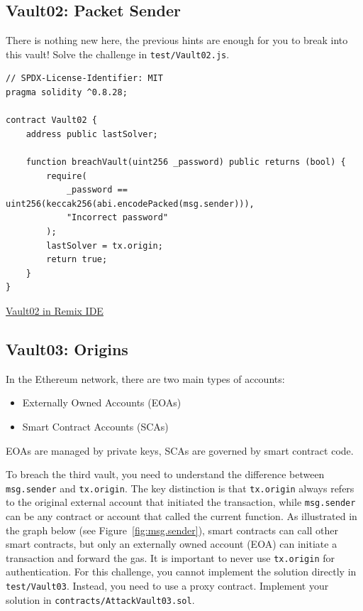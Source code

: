 \documentclass[12pt]{article}
\begin{document}
\subsection*{Vault02: Packet Sender}

There is nothing new here, the previous hints are enough for you to break into this vault! Solve the challenge in \texttt{test/Vault02.js}.

\begin{lstlisting}[language=Solidity]
// SPDX-License-Identifier: MIT
pragma solidity ^0.8.28;
 
contract Vault02 {
    address public lastSolver;
 
    function breachVault(uint256 _password) public returns (bool) {
        require(
            _password == uint256(keccak256(abi.encodePacked(msg.sender))),
            "Incorrect password"
        );
        lastSolver = tx.origin;
        return true;
    }
}
\end{lstlisting}

\medskip
\noindent
\href{https://remix.ethereum.org/?#activate=solidity&url=https://github.com/radovluk/unbreakable-vault/contracts/Vault02.sol&lang=en&optimize=false&runs=200&evmVersion=null&version=soljson-v0.8.28+commit.7893614a.js}{Vault02 in Remix IDE}

\subsection*{Vault03: Origins}

In the Ethereum network, there are two main types of accounts:

\begin{itemize}
  \item Externally Owned Accounts (EOAs)
  \item Smart Contract Accounts (SCAs)
\end{itemize}
EOAs are managed by private keys, SCAs are governed by smart contract code.

To breach the third vault, you need to understand the difference between \texttt{msg.sender} and \texttt{tx.origin}. The key distinction is that \texttt{tx.origin} always refers to the original external account that initiated the transaction, while \texttt{msg.sender} can be any contract or account that called the current function. As illustrated in the graph below (see Figure~\ref{fig:msg.sender}), smart contracts can call other smart contracts, but only an externally owned account (EOA) can initiate a transaction and forward the gas. It is important to never use \texttt{tx.origin} for authentication. For this challenge, you cannot implement the solution directly in \texttt{test/Vault03}. Instead, you need to use a proxy contract. Implement your solution in \texttt{contracts/AttackVault03.sol}.
\end{document}
